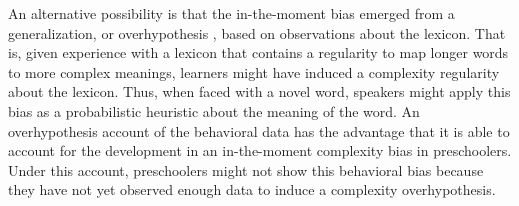 An alternative possibility is that  the  in-the-moment bias emerged from a generalization, or overhypothesis \cite{kemp2007}, based on observations about the lexicon. That is, given experience with a lexicon that contains a regularity to map longer words to more complex meanings, learners might have induced a complexity  regularity about the lexicon. Thus, when faced with a novel word, speakers might apply this bias as a probabilistic heuristic about the meaning of the word. An overhypothesis account of the behavioral data has the advantage that it is able to account for the development  in an in-the-moment complexity bias in preschoolers. Under this account, preschoolers might not show this behavioral bias because they have not yet observed enough data to induce a complexity overhypothesis.



